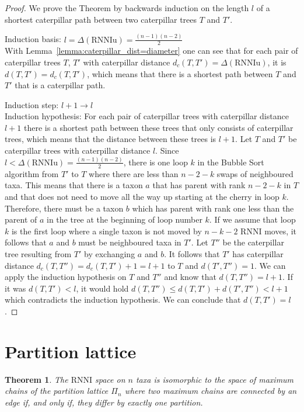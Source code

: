 \documentclass[11pt, a4paper]{article}
\newcommand{\rnni}{\mathrm{RNNI}}
\newcommand{\rnniu}{\mathrm{RNNIu}}
\newtheorem{theorem}[definition]{Theorem}
\begin{document}
\begin{proof}
    We prove the Theorem by backwards induction on the length $l$ of a shortest caterpillar path between two caterpillar trees $T$ and $T'$.

    Induction basis: $l = \Delta(\rnniu) = \frac{(n-1)(n-2)}{2}$\\
    With Lemma~\ref{lemma:caterpillar_dist=diameter} one can see that for each pair of caterpillar trees $T$, $T'$ with caterpillar distance $d_c(T,T') = \Delta(\rnniu)$, it is $d(T,T') = d_c(T,T')$, which means that there is a shortest path between $T$ and $T'$ that is a caterpillar path.

    Induction step: $l+1 \to l$\\
    Induction hypothesis: For each pair of caterpillar trees with caterpillar distance $l+1$ there is a shortest path between these trees that only consists of caterpillar trees, which means that the distance between these trees is $l+1$.
    Let $T$ and $T'$ be caterpillar trees with caterpillar distance $l$.
    Since $l < \Delta(\rnniu) = \frac{(n-1)(n-2)}{2}$, there is one loop $k$ in the Bubble Sort algorithm from $T'$ to $T$ where there are less than $n-2-k$ swaps of neighboured taxa.
    This means that there is a taxon $a$ that has parent with rank $n-2-k$ in $T$ and that does not need to move all the way up starting at the cherry in loop $k$.
    Therefore, there must be a taxon $b$ which has parent with rank one less than the parent of $a$ in the tree at the beginning of loop number $k$.
    If we assume that loop $k$ is the first loop where a single taxon is not moved by $n-k-2$ $\rnni$ moves, it follows that $a$ and $b$ must be neighboured taxa in $T'$.
    Let $T''$ be the caterpillar tree resulting from $T'$ by exchanging $a$ and $b$.
    It follows that $T'$ has caterpillar distance $d_c(T,T'') = d_c(T,T') + 1 = l+1$ to $T$ and $d(T',T'') = 1$.
    We can apply the induction hypothesis on $T$ and $T''$ and know that $d(T,T'') = l+1$.
    If it was $d(T,T') < l$, it would hold $d(T,T'') \leq d(T,T') + d(T',T'') < l + 1$ which contradicts the induction hypothesis.
    We can conclude that $d(T,T') = l$.

\end{proof}

\section{Partition lattice}


\begin{theorem}
	The $\rnni$ space on $n$ taxa is isomorphic to the space of maximum chains of the partition lattice $\Pi_n$ where two maximum chains are connected by an edge if, and only if, they differ by exactly one partition.
\end{theorem}



\end{document}
